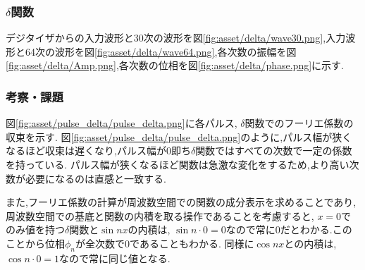 \subsubsection{$\delta$関数}
デジタイザからの入力波形と30次の波形を図\ref{fig:asset/delta/wave30.png},入力波形と64次の波形を図\ref{fig:asset/delta/wave64.png},各次数の振幅を図\ref{fig:asset/delta/Amp.png},各次数の位相を図\ref{fig:asset/delta/phase.png}に示す.
\begin{figure}[htbp]
  \begin{minipage}{0.5\hsize}
  \end{minipage}
  \begin{minipage}{0.5\hsize}
  \end{minipage} 
\end{figure}
\begin{figure}[htbp]
  \begin{minipage}{0.5\hsize}
  \end{minipage}
  \begin{minipage}{0.5\hsize}
  \end{minipage} 
\end{figure}
\newpage
\subsubsection{考察・課題}
図\ref{fig:asset/pulse_delta/pulse_delta.png}に各パルス, $\delta$関数でのフーリエ係数の収束を示す.
図\ref{fig:asset/pulse_delta/pulse_delta.png}のように,パルス幅が狭くなるほど収束は遅くなり,パルス幅が0即ち$\delta$関数ではすべての次数で一定の係数を持っている.
パルス幅が狭くなるほど関数は急激な変化をするため,より高い次数が必要になるのは直感と一致する.

また,フーリエ係数の計算が周波数空間での関数の成分表示を求めることであり,周波数空間での基底と関数の内積を取る操作であることを考慮すると,
$x=0$でのみ値を持つ$\delta$関数と$\sin nx$の内積は, $\sin n\cdot 0=0$なので常に$0$だとわかる.このことから位相$\phi_n$が全次数で0であることもわかる.
同様に$\cos nx$との内積は, $\cos n\cdot 0=1$なので常に同じ値となる.
